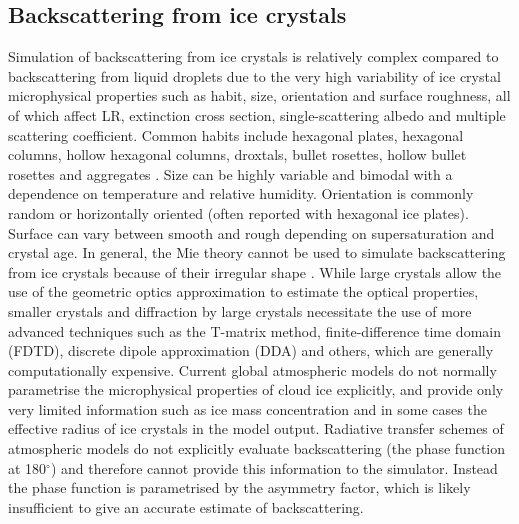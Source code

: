 \subsection{Backscattering from ice crystals}
\label{sec:3:ice-crystals}

Simulation of backscattering from ice crystals is relatively complex compared to
backscattering from liquid droplets due to the very high variability of ice
crystal microphysical properties such as habit, size, orientation and
surface roughness, all of which affect LR, extinction cross section,
single-scattering albedo and multiple scattering coefficient. Common habits
include hexagonal plates, hexagonal columns, hollow hexagonal columns, droxtals,
bullet rosettes, hollow bullet rosettes and aggregates \citep{baran2009,diedenhoven2017}.
Size can be highly variable and bimodal with a dependence on temperature and relative humidity.
Orientation is commonly random or horizontally oriented (often reported with hexagonal ice plates).
Surface can vary between smooth and rough depending on supersaturation and crystal age.
In general, the Mie theory
cannot be used to simulate backscattering from ice crystals because of
their irregular shape \citep{yang2014}. While large crystals allow the use of the geometric
optics approximation to estimate the optical properties, smaller crystals and
diffraction by large crystals necessitate the use of
more advanced techniques such as the T-matrix method, finite-difference time domain (FDTD),
discrete dipole approximation (DDA) and others, which are generally
computationally expensive.
Current global atmospheric models do not normally parametrise
the microphysical properties of cloud ice explicitly, and provide only very
limited information such as ice mass concentration and in some cases the
effective radius of ice crystals in the model output. Radiative transfer schemes of atmospheric
models do not explicitly evaluate
backscattering (the phase function at 180$^\circ$) and therefore cannot
provide this information to the simulator. Instead the phase function is
parametrised by the asymmetry factor, which is likely insufficient to give an
accurate estimate of backscattering.

